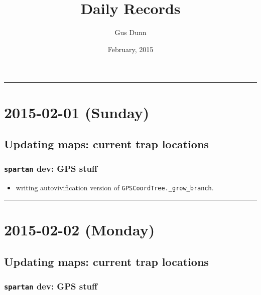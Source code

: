 \documentclass[letterpaper]{scrartcl}
\title{Daily Records\\\vspace{0.5em}{\large Caccone PostDoc}}
\author{Gus Dunn}
\date{February, 2015}
\begin{document}
\maketitle

{
\hypersetup{linkcolor=black}
\setcounter{tocdepth}{3}
\tableofcontents
}
\begin{center}\rule{0.5\linewidth}{\linethickness}\end{center}

\section{2015-02-01 (Sunday)}\label{sunday}

\subsection{Updating maps: current trap
locations}\label{updating-maps-current-trap-locations}

\subsubsection{\texttt{spartan} dev: GPS
stuff}\label{spartan-dev-gps-stuff}

\begin{itemize}
\itemsep1pt\parskip0pt
\item
  writing autovivification version of
  \texttt{GPSCoordTree.\_grow\_branch}.
\end{itemize}

\begin{center}\rule{0.5\linewidth}{\linethickness}\end{center}

\section{2015-02-02 (Monday)}\label{monday}

\subsection{Updating maps: current trap
locations}\label{updating-maps-current-trap-locations-1}

\subsubsection{\texttt{spartan} dev: GPS
stuff}\label{spartan-dev-gps-stuff-1}
\end{document}

